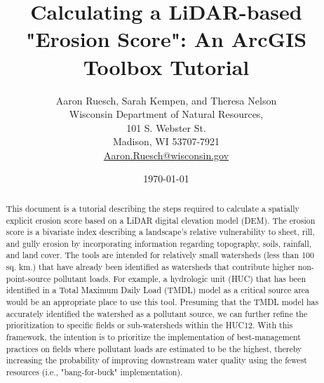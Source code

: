 \documentclass{article}
\begin{document}
\title{Calculating a LiDAR-based "Erosion Score": An ArcGIS Toolbox Tutorial}
\author{Aaron Ruesch, Sarah Kempen, and Theresa Nelson\\
	Wisconsin Department of Natural Resources,\\
	101 S. Webster St.\\
	Madison, WI 53707-7921\\
	\href{Aaron.Ruesch@wisconsin.gov}{Aaron.Ruesch@wisconsin.gov}
}
\date{\today}
\maketitle
\begin{abstract}
	This document is a tutorial describing the steps required to calculate a spatially explicit erosion score based on a LiDAR digital elevation model (DEM). The erosion score is a bivariate index describing a landscape's relative vulnerability to sheet, rill, and gully erosion by incorporating information regarding topography, soils, rainfall, and land cover. The tools are intended for relatively small watersheds (less than 100 sq. km.) that have already been identified as watersheds that contribute higher non-point-source pollutant loads. For example, a hydrologic unit (HUC) that has been identified in a Total Maximum Daily Load (TMDL) model as a critical source area would be an appropriate place to use this tool. Presuming that the TMDL model has accurately identified the watershed as a pollutant source, we can further refine the prioritization to specific fields or sub-watersheds within the HUC12. With this framework, the intention is to prioritize the implementation of best-management practices on fields where pollutant loads are estimated to be the highest, thereby increasing the probability of improving downstream water quality using the fewest resources (i.e., "bang-for-buck" implementation).
\end{abstract}
\pagebreak
\tableofcontents
\listoftables
\listoffigures
\pagebreak
\end{document}
